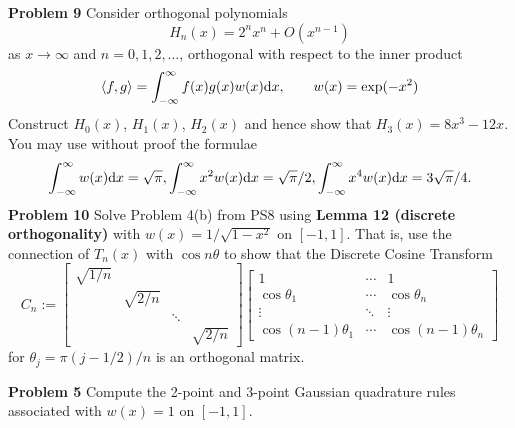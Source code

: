 \documentclass[12pt,a4paper]{article}
\begin{document}
\textbf{Problem 9} Consider orthogonal polynomials
\[
H_n(x) = 2^n x^n + O (x^{n-1})
\]
as $x \ensuremath{\rightarrow} \ensuremath{\infty}$ and $n = 0, 1, 2, \ensuremath{\ldots}$,  orthogonal with respect to the inner product
\[
\langle f, g \rangle = \int_{-\ensuremath{\infty}}^\ensuremath{\infty} f(x) g(x) w(x) {\rm d}x, \qquad w(x) = \exp(-x^2)
\]
Construct $H_0(x)$, $H_1(x)$, $H_2(x)$ and hence show that $H_3(x) = 8x^3-12x$. You may use without proof the formulae
\[
\int_{-\ensuremath{\infty}}^\ensuremath{\infty} w(x) {\rm d}x = \sqrt{\ensuremath{\pi}}, \int_{-\ensuremath{\infty}}^\ensuremath{\infty} x^2 w(x) {\rm d}x = \sqrt{\ensuremath{\pi}}/2,
\int_{-\ensuremath{\infty}}^\ensuremath{\infty} x^4 w(x) {\rm d}x = 3\sqrt{\ensuremath{\pi}}/4.
\]
\textbf{Problem 10} Solve Problem 4(b) from PS8 using \textbf{Lemma 12 (discrete orthogonality)} with $w(x) = 1/\sqrt{1-x^2}$ on $[-1,1]$. That is, use the connection of $T_n(x)$ with $\cos n \ensuremath{\theta}$ to show that the Discrete Cosine Transform
\[
C_n := \begin{bmatrix}
\sqrt{1/n} \\
 & \sqrt{2/n} \\
 && \ensuremath{\ddots} \\
 &&& \sqrt{2/n}
 \end{bmatrix}
\begin{bmatrix}
    1 & \ensuremath{\cdots} & 1\\
    \cos \ensuremath{\theta}_1 & \ensuremath{\cdots} & \cos \ensuremath{\theta}_n \\
    \ensuremath{\vdots} & \ensuremath{\ddots} & \ensuremath{\vdots} \\
    \cos (n-1)\ensuremath{\theta}_1 & \ensuremath{\cdots} & \cos (n-1)\ensuremath{\theta}_n
\end{bmatrix}
\]
for $\ensuremath{\theta}_j = \ensuremath{\pi}(j-1/2)/n$ is an orthogonal matrix.

\textbf{Problem 5} Compute the 2-point and 3-point Gaussian quadrature rules associated with $w(x) = 1$ on $[-1,1]$.
\end{document}
